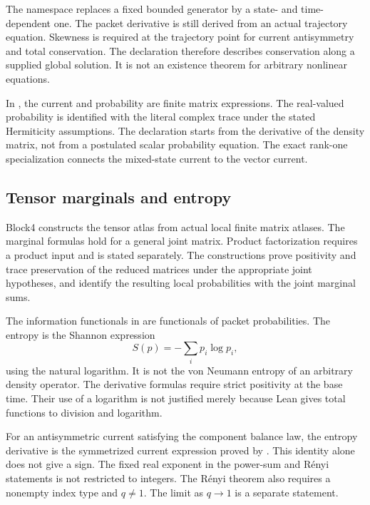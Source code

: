 The namespace  replaces a fixed bounded generator by a state- and time-dependent one. The packet derivative is still derived from an actual trajectory equation. Skewness is required at the trajectory point for current antisymmetry and total conservation. The declaration  therefore describes conservation along a supplied global solution. It is not an existence theorem for arbitrary nonlinear equations.

In , the current and probability are finite matrix expressions. The real-valued probability is identified with the literal complex trace under the stated Hermiticity assumptions. The declaration  starts from the derivative of the density matrix, not from a postulated scalar probability equation. The exact rank-one specialization  connects the mixed-state current to the vector current.

\subsection{Tensor marginals and entropy}

Block4 constructs the tensor atlas from actual local finite matrix atlases. The marginal formulas hold for a general joint matrix. Product factorization requires a product input and is stated separately. The  constructions prove positivity and trace preservation of the reduced matrices under the appropriate joint hypotheses, and identify the resulting local probabilities with the joint marginal sums.

The information functionals in  are functionals of packet probabilities. The entropy is the Shannon expression
\[
 S(p)=-\sum_i p_i\log p_i,
\]
using the natural logarithm. It is not the von Neumann entropy of an arbitrary density operator. The derivative formulas require strict positivity at the base time. Their use of a logarithm is not justified merely because Lean gives total functions to division and logarithm.

For an antisymmetric current satisfying the component balance law, the entropy derivative is the symmetrized current expression proved by . This identity alone does not give a sign. The fixed real exponent in the power-sum and R\'enyi statements is not restricted to integers. The R\'enyi theorem also requires a nonempty index type and \(q\ne1\). The limit as \(q\to1\) is a separate statement.

